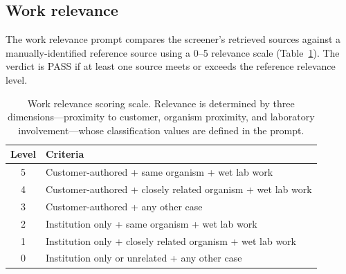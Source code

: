 \documentclass[utf8]{frontiers_suppmat}
\begin{document}
\subsection{Work relevance}

The work relevance prompt compares the screener's retrieved sources against a manually-identified reference source using a 0--5 relevance scale (Table~\ref{tab:relevance_scale}). The verdict is PASS if at least one source meets or exceeds the reference relevance level.

\begin{table}[H]
\centering
\caption{Work relevance scoring scale. Relevance is determined by three dimensions---proximity to customer, organism proximity, and laboratory involvement---whose classification values are defined in the prompt.}
\label{tab:relevance_scale}
\begin{tabular}{cl}
\toprule
\textbf{Level} & \textbf{Criteria} \\
\midrule
5 & Customer-authored + same organism + wet lab work \\
4 & Customer-authored + closely related organism + wet lab work \\
3 & Customer-authored + any other case \\
2 & Institution only + same organism + wet lab work \\
1 & Institution only + closely related organism + wet lab work \\
0 & Institution only or unrelated + any other case \\
\bottomrule
\end{tabular}
\end{table}
\end{document}
